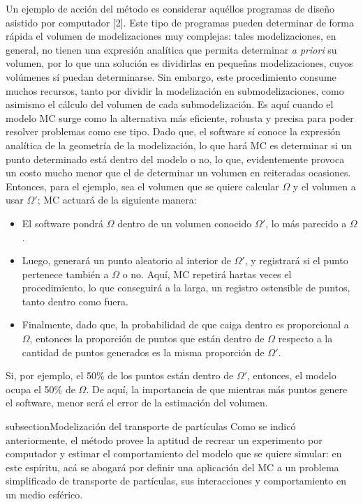 Un ejemplo de acción del método es considerar aquéllos programas de diseño asistido por computador [2]. Este tipo de programas pueden determinar de forma rápida el volumen de modelizaciones muy complejas: tales modelizaciones, en general, no tienen una expresión analítica que permita determinar \emph{a priori} su volumen, por lo que una solución es dividirlas en pequeñas modelizaciones, cuyos volúmenes sí puedan determinarse. Sin embargo, este procedimiento consume muchos recursos, tanto por dividir la modelización en submodelizaciones, como asimismo el cálculo del volumen de cada submodelización. Es aquí cuando el modelo MC surge como la alternativa más eficiente, robusta y precisa para poder resolver problemas como ese tipo. Dado que, el software sí conoce la expresión analítica de la geometría de la modelización, lo que hará MC es determinar si un punto determinado está dentro del modelo o no, lo que, evidentemente provoca un costo mucho menor que el de determinar un volumen en reiteradas ocasiones. Entonces, para el ejemplo, sea el volumen que se quiere calcular $\Omega$ y el volumen a usar $\Omega'$; MC actuará de la siguiente manera:

\begin{itemize}
\item El software pondrá $\Omega$ dentro de un volumen conocido $\Omega'$, lo más parecido a $\Omega$.
\item Luego, generará un punto aleatorio al interior de $\Omega'$, y registrará si el punto pertenece también a $\Omega$ o no. Aquí, MC repetirá hartas veces el procedimiento, lo que conseguirá a la larga, un registro ostensible de puntos, tanto dentro como fuera.
\item Finalmente, dado que, la probabilidad de que caiga dentro es proporcional a $\Omega$, entonces la proporción de puntos que están dentro de $\Omega$ respecto a la cantidad de puntos generados es la misma proporción de $\Omega'$.
\end{itemize}

Si, por ejemplo, el 50$\%$ de los puntos están dentro de $\Omega'$, entonces, el modelo ocupa el 50$\%$ de $\Omega$. De aquí, la importancia de que mientras más puntos genere el software, menor será el error de la estimación del volumen.

subsection{Modelización del transporte de partículas}
Como se indicó anteriormente, el método provee la aptitud de recrear un experimento por computador y estimar el comportamiento del modelo que se quiere simular: en este espíritu, acá se abogará por definir una aplicación del MC a un problema simplificado de transporte de partículas, sus interacciones y comportamiento en un medio esférico. \\

